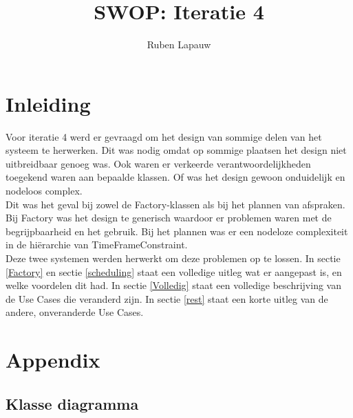 \documentclass[a4paper,10pt]{article}
\title{SWOP: Iteratie 4}
\author{Ruben Lapauw}
\date{}
\begin{document}
\maketitle
 \thispagestyle{empty}
\newpage
 \setcounter{page}{1}
\section{Inleiding}
Voor iteratie 4 werd er gevraagd om het design van sommige delen van het systeem te herwerken. 
Dit was nodig omdat op sommige plaatsen het design niet uitbreidbaar genoeg was. 
Ook waren er verkeerde verantwoordelijkheden toegekend waren aan bepaalde klassen. 
Of was het design gewoon onduidelijk en nodeloos complex. \\

Dit was het geval bij zowel de Factory-klassen als bij het plannen van afspraken. 
Bij Factory was het design te generisch waardoor er problemen waren met de begrijpbaarheid en het gebruik.
Bij het plannen was er een nodeloze complexiteit in de hiërarchie van TimeFrameConstraint.\\

Deze twee systemen werden herwerkt om deze problemen op te lossen. 
In sectie \ref{Factory} en sectie \ref{scheduling} staat een volledige uitleg wat er aangepast is, en welke voordelen dit had.
In sectie \ref{Volledig} staat een volledige beschrijving van de Use Cases die veranderd zijn.
In sectie \ref{rest} staat een korte uitleg van de andere, onveranderde Use Cases.



\section{Appendix}
\subsection{Klasse diagramma}
% 
 
\end{document}
